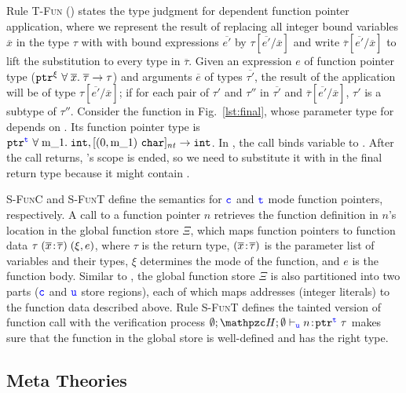 Rule \textsc{T-Fun} () states the type judgment for
dependent function pointer application, where we represent the result of
replacing all integer bound variables $\overline{x}$ in the type \(\tau\) with
with bound expressions $\overline{e'}$ by $\tau[\overline{e'} / \overline{x}]$
and write $\overline{\tau}[\overline{e'} / \overline{x}]$ to lift the
substitution to every type in \(\overline{\tau}\).
% 
Given an expression $e$ of function pointer type
($\mathtt{ptr}^{\xi}~{\forall \;\overline{x}.\;{\overline{\tau}}\to\tau}$) and arguments
$\overline{e}$ of types $\overline{\tau'}$,
% 
the result of the application will
be of type $\tau[\overline{e'} / \overline{x}]$;
if for each pair of \(\tau'\) and \(\tau''\) in \(\overline{\tau'}\) and
$\overline{\tau}[\overline{e'} / \overline{x}]$, \(\tau'\) is a subtype of
\(\tau''\).
Consider the  function in
Fig.~\ref{lst:final}, whose parameter type for  
depends on .
Its function pointer type is 
$\tptr{\tfun{\code{m_1}}{\tint,\tntarray{0}{\code{m_1}}{\texttt{char}}}{\tint}}{\tmode}$.
In , the call  binds variable  to .
After the call returns, 's scope is ended, so we need to substitute it with  in the final return type
because it might contain .

\textsc{S-FunC} and \textsc{S-FunT} define the semantics
for $\textcolor{blue}{\texttt{c}}$ and $\textcolor{blue}{\texttt{t}}$ mode function pointers, respectively. 
A call to a function pointer $n$ retrieves
 the function definition in $n$'s location in the global function store $\Xi$,
which maps function pointers to
function data $\tau\;({\overline{x}}\!:\!{\overline{\tau}})\;(\xi,e)$, where
$\tau$ is the return type, $({\overline{x}}\!:\!{\overline{\tau}})$
is the parameter list of variables and their types, 
$\xi$ determines the mode of the function, and $e$ is the
function body. 
Similar to \heap, the global function store $\Xi$ is also partitioned into
two parts ($\textcolor{blue}{\texttt{c}}$ and $\textcolor{blue}{\texttt{u}}$ store regions), each of which
maps addresses (integer literals) to the function data described above.
Rule \textsc{S-FunT} defines the tainted version of function call
with the verification process 
$\emptyset;\heap ; \emptyset \vdash_{\umode}\evalue{n}{\tptr{\tau}{\tmode}}$
makes sure that the function in the global store is well-defined and has the right type.

\subsection{Meta Theories}\label{sec:theorem}

